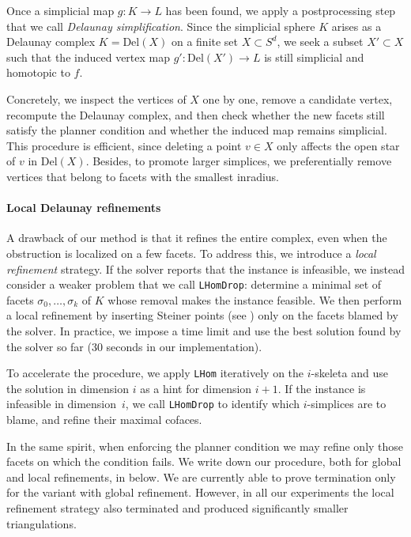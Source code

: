 \documentclass[a4paper,english,cleveref,autoref,thm-restate,nolineno]{socg-lipics-v2021}
\newcommand{\Del}[1] { \mathrm{Del}(#1) } %
\begin{document}
Once a simplicial map $g \colon K \to L$ has been found, we apply a postprocessing step that we call \emph{Delaunay simplification}. 
Since the simplicial sphere $K$ arises as a Delaunay complex $K = \Del{X}$ on a finite set $X \subset S^d$, we seek a subset $X' \subset X$ such that the induced vertex map $g' \colon \Del{X'} \to L$ is still simplicial and homotopic to $f$.

Concretely, we inspect the vertices of $X$ one by one, remove a candidate vertex, recompute the Delaunay complex, and then check whether the new facets still satisfy the planner condition and whether the induced map remains simplicial. 
This procedure is efficient, since deleting a point $v \in X$ only affects the open star of $v$ in $\Del{X}$. 
Besides, to promote larger simplices, we preferentially remove vertices that belong to facets with the smallest inradius.

\paragraph*{Local Delaunay refinements}

A drawback of our method is that it refines the entire complex, even when the obstruction is localized on a few facets. 
To address this, we introduce a \textit{local refinement} strategy. 
If the solver reports that the instance is infeasible, we instead consider a weaker problem that we call \texttt{LHomDrop}: determine a minimal set of facets $\sigma_0,\dots,\sigma_k$ of $K$ whose removal makes the instance feasible. 
We then perform a local refinement by inserting Steiner points (see ) only on the facets blamed by the solver.
In practice, we impose a time limit and use the best solution found by the solver so far (30 seconds in our implementation).

To accelerate the procedure, we apply \texttt{LHom} iteratively on the $i$-skeleta and use the solution in dimension $i$ as a hint for dimension $i+1$. 
If the instance is infeasible in dimension~$i$, we call \texttt{LHomDrop} to identify which $i$-simplices are to blame, and refine their maximal cofaces.

In the same spirit, when enforcing the planner condition we may refine only those facets on which the condition fails.
We write down our procedure, both for global and local refinements, in   below.
We are currently able to prove termination only for the variant with global refinement. However, in all our experiments the local refinement strategy also terminated and produced significantly smaller triangulations.
\end{document}
